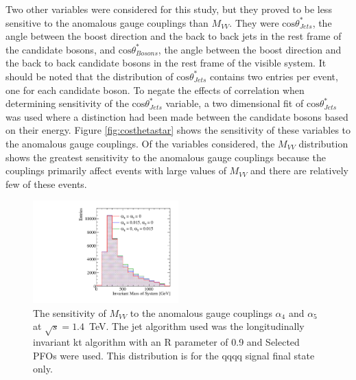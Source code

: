 Two other variables were considered for this study, but they proved to be less sensitive to the anomalous gauge couplings than $M_{VV}$.  They were $\text{cos}\theta^{*}_{Jets}$, the angle between the boost direction and the back to back jets in the rest frame of the candidate bosons, and $\text{cos}\theta^{*}_{Bosons}$, the angle between the boost direction and the back to back candidate bosons in the rest frame of the visible system.  It should be noted that the distribution of $\text{cos}\theta^{*}_{Jets}$ contains two entries per event, one for each candidate boson.  To negate the effects of correlation when determining sensitivity of the $\text{cos}\theta^{*}_{Jets}$ variable, a two dimensional fit of $\text{cos}\theta^{*}_{Jets}$ was used where a distinction had been made between the candidate bosons based on their energy.  Figure \ref{fig:costhetastar} shows the sensitivity of these variables to the anomalous gauge couplings.  Of the variables considered, the $M_{VV}$ distribution shows the greatest sensitivity to the anomalous gauge couplings because the couplings primarily affect events with large values of $M_{VV}$ and there are relatively few of these events.  

\begin{figure}[h!]
\centering
\includegraphics[width=0.5\textwidth]{PhysicsAnalysis/Plots/SensitiveDistributions/MVVs_SPFOs_kt_0p90_1400GeV.pdf}
\caption[The sensitivity of $M_{VV}$ to the anomalous gauge couplings $\alpha_{4}$ and $\alpha_{5}$ at $\sqrt{s}=1.4$~TeV.  The jet algorithm used was the longitudinally invariant kt algorithm with an R parameter of 0.9 and Selected PFOs were used.  This distribution is for the \nu{\nu}qqqq signal final state only.]{The sensitivity of $M_{VV}$ to the anomalous gauge couplings $\alpha_{4}$ and $\alpha_{5}$ at $\sqrt{s}=1.4$~TeV.  The jet algorithm used was the longitudinally invariant kt algorithm with an R parameter of 0.9 and Selected PFOs were used.  This distribution is for the \nu{\nu}qqqq signal final state only.}
\label{fig:mvv}
\end{figure}

